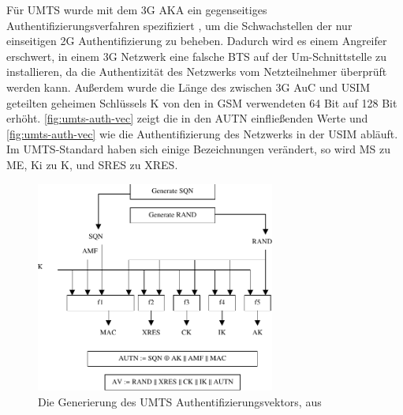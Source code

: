 
Für \ac{UMTS} wurde mit dem 3G \ac{AKA} ein gegenseitiges Authentifizierungsverfahren spezifiziert , um die Schwachstellen der nur einseitigen 2G Authentifizierung zu beheben. Dadurch wird es einem Angreifer erschwert, in einem 3G Netzwerk eine falsche \ac{BTS} auf der \ac{Um}-Schnittstelle zu installieren, da die Authentizität des Netzwerks vom Netzteilnehmer überprüft werden kann. Außerdem wurde die Länge des zwischen 3G \ac{AuC} und \ac{USIM} geteilten geheimen Schlüssels \ac{K} von den in \ac{GSM} verwendeten 64 Bit auf 128 Bit erhöht. \autoref{fig:umts-auth-vec} zeigt die in den \ac{AUTN} einfließenden Werte und \autoref{fig:umts-auth-vec} wie die Authentifizierung des Netzwerks in der \ac{USIM} abläuft. Im \ac{UMTS}-Standard haben sich einige Bezeichnungen verändert, so wird \ac{MS} zu \ac{ME}, \ac{Ki} zu \ac{K}, und \ac{SRES} zu \ac{XRES}.

\begin{figure}[H]
  \begin{center}
    \includegraphics[width=0.7\textwidth]{figures/33102_fig_7}
  \end{center}
  \caption[Die Generierung des UMTS Authentifizierungsvektors]{Die Generierung des \ac{UMTS} Authentifizierungsvektors, aus } \label{fig:umts-auth-vec}
\end{figure}

